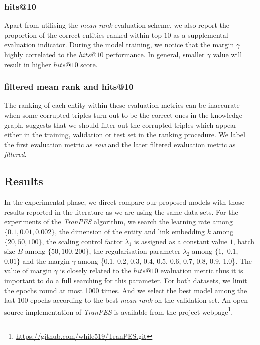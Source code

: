 \documentclass[9pt]{sig-alternate-05-2015}
\begin{document}
\subsubsection{hits@10} 
Apart from utilising the \emph{mean rank} evaluation scheme, we also report the proportion of the correct entities ranked within top $10$  as a supplemental evaluation indicator. During the model training, we notice that the margin $\gamma$ highly correlated to the $hits@10$ performance. In general, smaller $\gamma$ value will result in higher $hits@10$ score.

\subsubsection{filtered mean rank and hits@10}
The ranking of each entity within these evaluation metrics can be inaccurate when some corrupted triples turn out to be the correct ones in the knowledge graph. \cite{bordes_translating_2013} suggests that we should filter out the corrupted triples which appear either in the training, validation or test set in the ranking procedure.  We label the first evaluation metric as \emph{raw} and the later filtered evaluation metric as \emph{filtered}.


\subsection{Results}
In the experimental phase, we direct compare our proposed models with those results reported in the literature  \cite{lin_learning_2015} as we are using the same data sets. For the experiments of the \emph{TranPES} algorithm, we search the learning rate among $\{ 0.1, 0.01, 0.002\}$, the dimension of the entity and link embedding $k$ among $\{ 20, 50, 100 \}$, the scaling control factor $\lambda_1$ is assigned as a constant value $1$, batch size $B$ among $\{50, 100, 200\}$, the regularisation parameter $\lambda_2$ among $\{ 1,$ $0.1,$ $0.01\}$ and the margin $\gamma$ among \{0.1, 0.2, 0.3, 0.4, 0.5, 0.6, 0.7, 0.8, 0.9, 1.0\}. The value of margin $\gamma$ is closely related to the $hits@10$ evaluation metric thus it is important to do a full searching for this parameter. For both datasets, we limit the epochs round at most 1000 times.  And we select the best model among the last $100$ epochs according to the best \emph{mean rank} on the validation set. An open-source implementation of \emph{TranPES} is available from the project webpage\footnote{\url{https://github.com/while519/TranPES.git}}.
\end{document}
